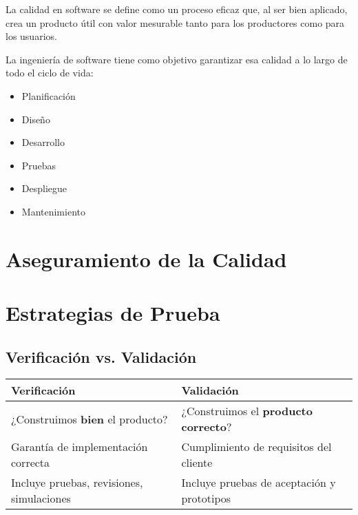 \localtableofcontents
\begin{definicion}
    La calidad en software se define como un proceso eficaz que, al ser bien aplicado, crea un producto útil con valor mesurable tanto para los productores como para los usuarios.
\end{definicion}

La ingeniería de software tiene como objetivo garantizar esa calidad a lo largo de todo el ciclo de vida:

\begin{itemize}
    \item Planificación
    \item Diseño
    \item Desarrollo
    \item Pruebas
    \item Despliegue
    \item Mantenimiento
\end{itemize}


\section{Aseguramiento de la Calidad}\label{sec:aseguramiento-de-la-calidad}


\section{Estrategias de Prueba}\label{sec:estrategias-de-prueba}

\subsection{Verificación vs. Validación}\label{subsec:verificacion-vs.-validacion}

\begin{center}
    \begin{tabular}{|l|l|}
        \hline
        \textbf{Verificación}                     & \textbf{Validación}                         \\
        \hline
        ¿Construimos \textbf{bien} el producto?   & ¿Construimos el \textbf{producto correcto}? \\
        Garantía de implementación correcta       & Cumplimiento de requisitos del cliente      \\
        Incluye pruebas, revisiones, simulaciones & Incluye pruebas de aceptación y prototipos  \\
        \hline
    \end{tabular}
\end{center}

